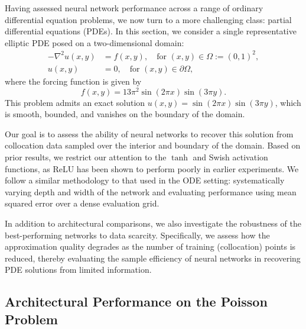 Having assessed neural network performance across a range of ordinary differential equation problems,
we now turn to a more challenging class: partial differential equations (PDEs). In this section, 
we consider a single representative elliptic PDE posed on a two-dimensional domain:
\[
\begin{aligned}
    -\nabla^2 u(x, y) &= f(x, y), \quad \text{for } (x, y) \in \Omega := (0,1)^2, \\
    u(x, y) &= 0, \quad \text{for } (x, y) \in \partial \Omega,
\end{aligned}
\]
where the forcing function is given by
\[
f(x, y) = 13\pi^2 \sin(2\pi x)\sin(3\pi y).
\]
This problem admits an exact solution \( u(x, y) = \sin(2\pi x)\sin(3\pi y) \), which is smooth, bounded, 
and vanishes on the boundary of the domain.

Our goal is to assess the ability of neural networks to recover this solution from collocation data 
sampled over the interior and boundary of the domain. Based on prior results, we restrict our 
attention to the \(\tanh\) and Swish activation functions, as ReLU has been shown to perform poorly 
in earlier experiments. We follow a similar methodology to that used in the ODE setting: 
systematically varying depth and width of the network and evaluating performance using mean 
squared error over a dense evaluation grid.

In addition to architectural comparisons, we also investigate the robustness of the best-performing 
networks to data scarcity. Specifically, we assess how the approximation quality degrades as 
the number of training (collocation) points is reduced, thereby evaluating the sample efficiency 
of neural networks in recovering PDE solutions from limited information.

\subsection{Architectural Performance on the Poisson Problem}

